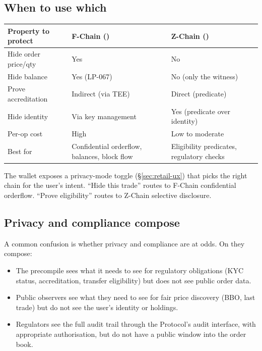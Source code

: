 \subsection{When to use which}

\begin{longtable}{p{}p{}p{}}
\toprule
\textbf{Property to protect} & \textbf{F-Chain (\FHE{})} & \textbf{Z-Chain (\ZKP{})} \\
\midrule
Hide order price/qty & Yes & No \\
Hide balance & Yes (LP-067) & No (only the witness) \\
Prove accreditation & Indirect (via TEE) & Direct (predicate) \\
Hide identity & Via key management & Yes (predicate over identity) \\
Per-op cost & High & Low to moderate \\
Best for & Confidential orderflow, balances, block flow & Eligibility predicates, regulatory checks \\
\bottomrule
\end{longtable}

The wallet exposes a privacy-mode toggle (\S\ref{sec:retail-ux})
that picks the right chain for the user's intent. ``Hide this
trade'' routes to F-Chain confidential orderflow. ``Prove
eligibility'' routes to Z-Chain selective disclosure.

\subsection{Privacy and compliance compose}

A common confusion is whether privacy and compliance are at odds.
On \Zoo{} \DEX{} they compose:

\begin{itemize}[leftmargin=1.2em]
  \item The \Liquidity{} precompile sees what it needs to see for
        regulatory obligations (KYC status, accreditation, transfer
        eligibility) but does not see public order data.
  \item Public observers see what they need to see for fair price
        discovery (BBO, last trade) but do not see the user's
        identity or holdings.
  \item Regulators see the full audit trail through the \Liquidity{}
        Protocol's audit interface, with appropriate authorisation,
        but do not have a public window into the order book.
\end{itemize}


